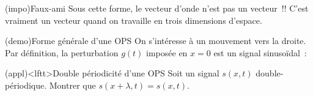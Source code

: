 \documentclass[../../main/main.tex]{subfiles}
\begin{document}
\begin{tcb*}(impo){Faux-ami}
	Sous cette forme, le vecteur d'onde n'est pas un vecteur~!! C'est vraiment un
	vecteur quand on travaille en trois dimensions d'espace.
\end{tcb*}

\begin{tcb*}(demo){Forme générale d'une OPS}
	On s'intéresse à un mouvement vers la droite. Par définition, la perturbation
	$g(t)$ imposée en $x=0$ est un signal sinusoïdal~:
	\vspace{-15pt}
\end{tcb*}

\begin{tcb*}(appl)<lftt>{Double périodicité d'une OPS}
	Soit un signal $s (x,t)$ double-périodique. Montrer que $s (x+\lambda,t) = s
		(x,t)$.
	\tcblower
	\begin{isd}[sidebyside align=top]
		\vspace{-15pt}
		\vspace{-15pt}
		\tcblower
		\vspace{-15pt}
		\vspace{-15pt}
	\end{isd}
	\vspace{-20pt}
\end{tcb*}
\end{document}
